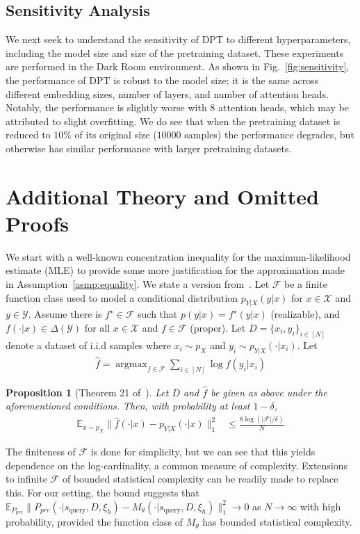 \documentclass{article}
\newcommand{\Fcal}{\mathcal{F}}
\newcommand{\Xcal}{\mathcal{X}}
\newcommand{\Ycal}{\mathcal{Y}}
\newcommand{\E}{\mathbb{E}}
\newcommand*{\argmax}{\mathop{\mathrm{argmax}}}
\newcommand{\macroName}{DPT}
\newcommand{\squery}{s_{\text{query}}}
\newtheorem{proposition}[claim]{Proposition}
\begin{document}
\subsection{Sensitivity Analysis}
We next seek to understand the sensitivity of \macroName{} to different hyperparameters, including the model size and size of the pretraining dataset. These experiments are performed in the Dark Room environment. As shown in Fig.~\ref{fig:sensitivity}, the performance of \macroName{} is robust to the model size; it is the same across different embedding sizes, number of layers, and number of attention heads. Notably, the performance is slightly worse with $8$ attention heads, which may be attributed to slight overfitting. We do see that when the pretraining dataset is reduced to $10\%$ of its original size ($10000$ samples) the performance degrades, but otherwise has similar performance with larger pretraining datasets.
\section{Additional Theory and Omitted Proofs}\label{app:theory}
We start with a well-known concentration inequality for the maximum-likelihood estimate (MLE) to provide some more justification for the approximation made in Assumption~\ref{asmp:equality}. We state a version from~\cite{agarwal2020flambe}.
Let $\Fcal$ be a finite function class used to model a conditional distribution $p_{Y| X} (y | x)$ for $x \in \Xcal$ and $y \in \Ycal$. Assume there is $f^\star \in \Fcal$ such that $p(y | x) = f^\star(y | x)$ (realizable), and $f(\cdot| x) \in \Delta(\Ycal)$ for all $x \in \Xcal$ and $f \in \Fcal$ (proper). Let $D = \{ x_i, y_i\}_{i \in [N]}$ denote a dataset of i.i.d samples where $x_i \sim p_X$ and $y_i \sim p_{Y | X} (\cdot | x_i)$.
Let
\begin{align}
    \hat f = \argmax_{f \in \Fcal}  \sum_{i \in [N]} \log f(y_i | x_i)
\end{align}
\begin{proposition}[Theorem 21 of~\cite{agarwal2020flambe}]\label{prop:mle}
Let $D$ and $\hat f$ be given as above under the aforementioned conditions. Then, with probability at least $1 - \delta$,
\begin{align}
    \E_{x \sim p_X}  \| \hat f(\cdot | x) - p_{Y| X}(\cdot | x) \|_1^2 & \leq \frac{8 \log \left( |\Fcal| /\delta \right) }{N}
\end{align}
\end{proposition}
The finiteness of $\Fcal$ is done for simplicity, but we can see that this yields dependence on the log-cardinality,  a common measure of complexity. Extensions to infinite $\Fcal$ of bounded statistical complexity can be readily made to replace this.
For our setting, the bound suggests that $\E_{P_{pre}} \| P_{pre}(\cdot | \squery, D, \xi_h) - M_{\theta} (\cdot | \squery, D, \xi_h) \|_1^2 \rightarrow 0$ as $N \rightarrow \infty$ with high probability, provided the function class of $M_{\theta}$ has bounded statistical complexity.
\end{document}
